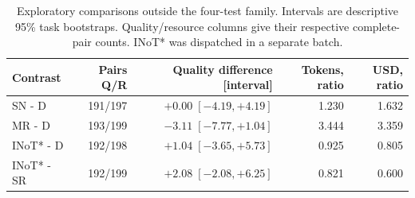 \begin{table}[htbp]\centering\small
\caption{Exploratory comparisons outside the four-test family. Intervals are descriptive 95\% task bootstraps. Quality/resource columns give their respective complete-pair counts. INoT* was dispatched in a separate batch.}\label{tab:heldout-exploratory}
\begin{tabular}{lrrrr}\toprule
Contrast & Pairs Q/R & Quality difference [interval] & Tokens, ratio & USD, ratio\\
\midrule
SN - D & 191/197 & $+0.00\;[-4.19,+4.19]$ & 1.230 & 1.632\\
MR - D & 193/199 & $-3.11\;[-7.77,+1.04]$ & 3.444 & 3.359\\
INoT* - D & 192/198 & $+1.04\;[-3.65,+5.73]$ & 0.925 & 0.805\\
INoT* - SR & 192/199 & $+2.08\;[-2.08,+6.25]$ & 0.821 & 0.600\\
\bottomrule\end{tabular}\end{table}
